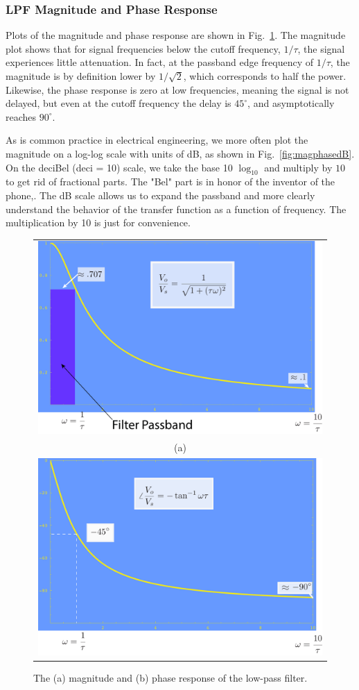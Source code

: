 
\subsubsection{LPF Magnitude and Phase Response}

Plots of the magnitude and phase response are shown in Fig.~\ref{fig:magphase}.  The magnitude plot shows that for signal frequencies below the cutoff frequency, $1/\tau$, the signal experiences little attenuation.  In fact, at the passband edge frequency of $1/\tau$, the magnitude is by definition lower by $1/\sqrt{2}$, which corresponds to half the power.  Likewise, the phase response is zero at low frequencies, meaning the signal is not delayed, but even at the cutoff frequency the delay is $45^\circ$, and asymptotically reaches $90^\circ$.

As is common practice in electrical engineering, we more often plot the magnitude on a log-log scale with units of dB,  as shown in Fig.~\ref{fig:magphasedB}.  On the deciBel (deci = 10) scale, we take the base 10 $\log_{10}$ and multiply by $10$ to get rid of fractional parts.  The "Bel" part is in honor of the inventor of the phone,.  The dB scale allows us to expand the passband and more clearly understand the behavior of the transfer function as a function of frequency.  The multiplication by 10 is just for convenience.

\begin{figure}[tbp]
\begin{center}
\begin{tabular}{c}
\includegraphics[width=.6\columnwidth]{mag} \\
(a) \\
\includegraphics[width=.6\columnwidth]{phase} \\
\end{tabular}
\end{center}
\caption{The (a) magnitude and (b) phase response of the low-pass filter. } \label{fig:magphase}
\end{figure}


